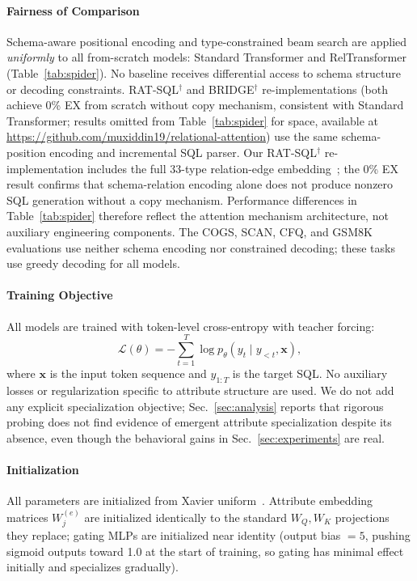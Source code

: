 \documentclass[review]{elsarticle}
\begin{document}
\paragraph{Fairness of Comparison}
Schema-aware positional encoding and type-constrained beam search are applied \emph{uniformly} to all from-scratch models: Standard Transformer and RelTransformer (Table~\ref{tab:spider}). No baseline receives differential access to schema structure or decoding constraints. RAT-SQL$^\dagger$ and BRIDGE$^\dagger$ re-implementations (both achieve 0\% EX from scratch without copy mechanism, consistent with Standard Transformer; results omitted from Table~\ref{tab:spider} for space, available at \url{https://github.com/muxiddin19/relational-attention}) use the same schema-position encoding and incremental SQL parser. Our RAT-SQL$^\dagger$ re-implementation includes the full 33-type relation-edge embedding~\cite{wang2020ratsql}; the 0\% EX result confirms that schema-relation encoding alone does not produce nonzero SQL generation without a copy mechanism. Performance differences in Table~\ref{tab:spider} therefore reflect the attention mechanism architecture, not auxiliary engineering components. The COGS, SCAN, CFQ, and GSM8K evaluations use neither schema encoding nor constrained decoding; these tasks use greedy decoding for all models.

\paragraph{Training Objective}
All models are trained with token-level cross-entropy with teacher forcing:
\begin{equation}
\mathcal{L}(\theta) = -\sum_{t=1}^{T} \log p_\theta(y_t \mid y_{<t}, \mathbf{x}),
\end{equation}
where $\mathbf{x}$ is the input token sequence and $y_{1:T}$ is the target SQL. No auxiliary losses or regularization specific to attribute structure are used. We do not add any explicit specialization objective; Sec.~\ref{sec:analysis} reports that rigorous probing does not find evidence of emergent attribute specialization despite its absence, even though the behavioral gains in Sec.~\ref{sec:experiments} are real.

\paragraph{Initialization}
All parameters are initialized from Xavier uniform~\cite{vaswani2017attention}. Attribute embedding matrices $W_j^{(e)}$ are initialized identically to the standard $W_Q, W_K$ projections they replace; gating MLPs are initialized near identity (output bias $= 5$, pushing sigmoid outputs toward 1.0 at the start of training, so gating has minimal effect initially and specializes gradually).
\end{document}
